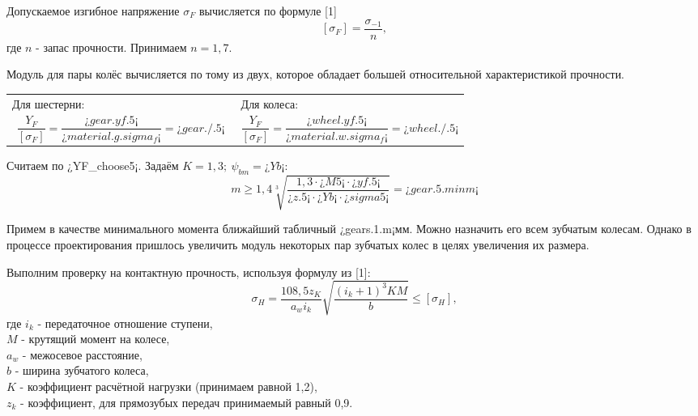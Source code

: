 \documentclass[14pt,a4paper,russian]{scrartcl}
\begin{document}
        Допускаемое изгибное напряжение \( \sigma_F \) вычисляется по формуле [1] 
        \[ [\sigma_F] = \frac{\sigma_{-1}}{n}, \]
        где \( n \) - запас прочности. Принимаем \( n=1,7 \).\par
        
        Модуль для пары колёс вычисляется по тому из двух, которое обладает
        большей относительной характеристикой прочности.

       \begin{table}[h!]
            \begin{center}
                \begin{tabular}{p{0.5\linewidth}p{0.5\linewidth}}
                    Для шестерни:  &   Для колеса:\\
                    \[ \frac{Y_F}{[\sigma_F]} = 
                        \frac{¿gear.yf.5¡}{¿material.g.sigma_f¡} = ¿gear./.5¡\] &
                    \[ \frac{Y_F}{[\sigma_F]} = 
                    \frac{¿wheel.yf.5¡}{¿material.w.sigma_f¡} = ¿wheel./.5¡ \]\\                    
                \end{tabular}
            \end{center}
        \end{table}

        Считаем по ¿YF_choose5¡. Задаём \( K=1,3;\ \psi_{bm}=¿Yb¡ \):
        \[ m \geq 1,4\sqrt[3]{\frac{1,3\cdot ¿M5¡\cdot ¿yf.5¡}{¿z.5¡\cdot ¿Yb¡\cdot ¿sigma5¡}}=¿gear.5.minm¡ \]
        
        Примем в качестве минимального момента ближайший табличный ¿gears.1.m¡мм. Можно назначить его
        всем зубчатым колесам. Однако в процессе проектирования пришлось увеличить модуль некоторых
        пар зубчатых колес в целях увеличения их размера.\par 
        
        Выполним проверку на контактную прочность, используя формулу из [1]:
        \[ \sigma_H = \frac{108,5 z_K}{a_w i_{k}}\sqrt{\frac{(i_k+1)^3KM}{b}} \leq [\sigma_H], \]
        где \( i_k \) - передаточное отношение ступени,\\
            \( M \) - крутящий момент на колесе,\\
            \( a_w \) - межосевое расстояние,\\
            \( b \) - ширина зубчатого колеса,\\
            \( K \) - коэффициент расчётной нагрузки (принимаем равной 1,2),\\
            \( z_k \) - коэффициент, для прямозубых передач принимаемый равный 0,9.\par
        
\end{document}
